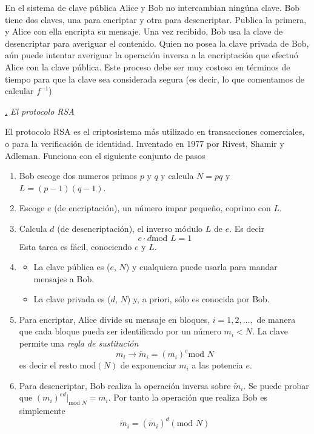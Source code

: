 \documentclass[a4paper,11pt]{book} %
\numberwithin{equation}{chapter}
\def\subsubiContadorIt{\par\addtocounter{subsubsection}{1}\underline{\it\thesubsubsection.}\hskip0.5cm \setcounter{subsubsubsectionIt}{0}}
\newcommand{\SubsubiIt}[1]{
		\subsubiContadorIt \textit{#1}
	}
\newcounter{subsubsubsectionIt}[subsubsection]
\begin{document}
	En el sistema de clave pública Alice y Bob no intercambian ningúna clave. Bob tiene dos claves, una para encriptar y otra para desencriptar. Publica la primera, y Alice con ella encripta su mensaje.
Una vez recibido, Bob usa la clave de desencriptar para averiguar el contenido. Quien no posea la clave privada de Bob, aún puede intentar averiguar la operación inversa a la encriptación que efectuó Alice con la clave pública. Este proceso debe ser muy costoso en términos de tiempo para que la clave sea considerada segura (es decir, lo que comentamos de calcular $f^{-1}$)


			\SubsubiIt{El protocolo RSA}
	
El protocolo RSA es el criptosistema más utilizado en transacciones comerciales, o para la verificación de identidad. Inventado en 1977 por Rivest, Shamir y Adleman. Funciona con el siguiente conjunto de pasos
\begin{enumerate}
	\item Bob escoge dos numeros primos $p$ y $q$ y calcula $N = pq$ y $L = (p - 1)(q - 1)$.
	\item Escoge $e$ (de encriptación), un número impar pequeño, coprimo con $L$.
	\item Calcula $d$ (de desencriptación), el inverso módulo $L$ de $e$. Es decir
		\begin{equation}
		e \cdot d \text{mod }L = 1
		\end{equation}
	Esta tarea es fácil, conociendo $e$ y $L$.
	\item 
	\begin{itemize}
		\item La clave pública es ($e$, $N$) y cualquiera puede usarla para mandar mensajes a Bob.
		\item La clave privada es ($d$, $N$) y, a priori, sólo es conocida por Bob.
	\end{itemize}
	\item Para encriptar, Alice divide su mensaje en bloques, $i = 1, 2, \dots,$ de manera que cada bloque pueda ser identificado por un número $m_i < N$. La clave permite una \textit{regla de sustitución}
		\begin{equation}
		m_i \rightarrow \tilde{m}_i = (m_i)^e \text{mod } N
		\end{equation}
		es decir el resto mod$(N)$ de exponenciar $m_i$ a las potencia $e$.
	\item  Para desencriptar, Bob realiza la operación inversa sobre $\tilde{m}_i$. Se puede probar que $(m_i)^{ed}|_{\text{mod }N} = m_i$. Por tanto la operación que realiza Bob es simplemente
		\begin{equation}
		\tilde{m}_i = (\tilde{m}_i)^d (\text{mod }N)
		\end{equation}
\end{enumerate}
\end{document}
